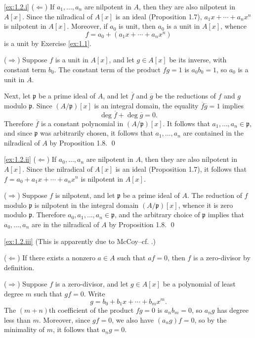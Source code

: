 \noindent
\ref{ex:1.2.i}
($\Leftarrow$)
If $a_1,\ldots,a_n$ are nilpotent in $A$, then they are also nilpotent in $A[x]$.
Since the nilradical of $A[x]$ is an ideal (Proposition 1.7), $a_1 x + \cdots + a_n x^n$ is nilpotent in $A[x]$.
Moreover, if $a_0$ is unit, then $a_0$ is a unit in $A[x]$, whence
\begin{equation*}
f = a_0 + (a_1 x + \cdots + a_n x^n)
\end{equation*}
is a unit by Exercise \ref{ex:1.1}.

($\Rightarrow$)
Suppose $f$ is a unit in $A[x]$, and let $g \in A[x]$ be its inverse, with constant term $b_0$.
The constant term of the product $f g = 1$ is $a_0 b_0 = 1$, so $a_0$ is a unit in $A$.

Next, let $\mathfrak p$ be a prime ideal of $A$, and let $\overline f$ and $\overline g$ be the reductions of $f$ and $g$ modulo $\mathfrak p$.
Since $(A/\mathfrak p)[x]$ is an integral domain, the equality $\overline f \overline g = 1$ implies
\begin{equation*}
\deg \overline f + \deg \overline g = 0.
\end{equation*}
Therefore $\overline f$ is a constant polynomial in $(A/\mathfrak p)[x]$.
It follows that $a_1,\ldots,a_n \in \mathfrak p$, and since $\mathfrak p$ was arbitrarily chosen, it follows that $a_1,\ldots, a_n$ are contained in the nilradical of $A$ by Proposition 1.8.
\qed

\noindent
\ref{ex:1.2.ii}
($\Leftarrow$)
If $a_0,\ldots,a_n$ are nilpotent in $A$, then they are also nilpotent in $A[x]$.
Since the nilradical of $A[x]$ is an ideal (Proposition 1.7), it follows that $f = a_0 + a_1 x + \cdots + a_n x^n$ is nilpotent in $A[x]$.

($\Rightarrow$)
Suppose $f$ is nilpotent, and let $\mathfrak p$ be a prime ideal of $A$.
The reduction of $f$ modulo $\mathfrak p$ is nilpotent in the integral domain $(A/\mathfrak p)[x]$, whence it is zero modulo $\mathfrak p$.
Therefore $a_0,a_1,\ldots,a_n \in \mathfrak p$, and the arbitrary choice of $\mathfrak p$ implies that $a_0,\ldots,a_n$ are in the nilradical of $A$ by Proposition 1.8.
\qed

\noindent
\ref{ex:1.2.iii}
(This is apparently due to McCoy--cf. \cite[Theorem 2]{McCoyDivisorsOfZero}.)

($\Leftarrow$)
If there exists a nonzero $a \in A$ such that $a f = 0$, then $f$ is a zero-divisor by definition.

($\Rightarrow$)
Suppose $f$ is a zero-divisor, and let $g \in A[x]$ be a polynomial of least degree $m$ such that $g f = 0$.
Write
\begin{equation*}
g = b_0 + b_1 x + \cdots + b_m x^m.
\end{equation*}
The $(m+n)$th coefficient of the product $f g = 0$ is $a_n b_m = 0$, so $a_n g$ has degree less than $m$.
Moreover, since $g f = 0$, we also have $(a_n g) f = 0$, so by the minimality of $m$, it follows that $a_n g = 0$.

